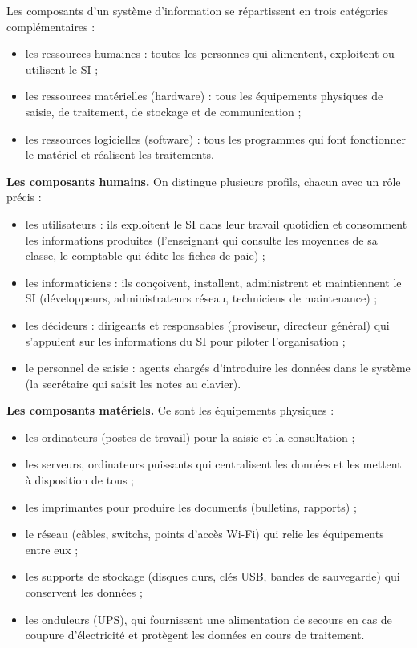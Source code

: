 \documentclass[11pt]{article}
\newcommand{\cle}[1]{{\popxbold\color{popdark}#1}}
\begin{document}
\begin{definition}
Les \cle{composants} d'un système d'information se répartissent en trois catégories complémentaires :
\begin{itemize}
\item les \cle{ressources humaines} : toutes les personnes qui alimentent, exploitent ou utilisent le SI ;
\item les \cle{ressources matérielles} (hardware) : tous les équipements physiques de saisie, de traitement, de stockage et de communication ;
\item les \cle{ressources logicielles} (software) : tous les programmes qui font fonctionner le matériel et réalisent les traitements.
\end{itemize}
\end{definition}

\textbf{Les composants humains.} On distingue plusieurs profils, chacun avec un rôle précis :
\begin{itemize}
\item les \cle{utilisateurs} : ils exploitent le SI dans leur travail quotidien et consomment les informations produites (l'enseignant qui consulte les moyennes de sa classe, le comptable qui édite les fiches de paie) ;
\item les \cle{informaticiens} : ils conçoivent, installent, administrent et maintiennent le SI (développeurs, administrateurs réseau, techniciens de maintenance) ;
\item les \cle{décideurs} : dirigeants et responsables (proviseur, directeur général) qui s'appuient sur les informations du SI pour piloter l'organisation ;
\item le \cle{personnel de saisie} : agents chargés d'introduire les données dans le système (la secrétaire qui saisit les notes au clavier).
\end{itemize}

\textbf{Les composants matériels.} Ce sont les équipements physiques :
\begin{itemize}
\item les \cle{ordinateurs} (postes de travail) pour la saisie et la consultation ;
\item les \cle{serveurs}, ordinateurs puissants qui centralisent les données et les mettent à disposition de tous ;
\item les \cle{imprimantes} pour produire les documents (bulletins, rapports) ;
\item le \cle{réseau} (câbles, switchs, points d'accès Wi-Fi) qui relie les équipements entre eux ;
\item les \cle{supports de stockage} (disques durs, clés USB, bandes de sauvegarde) qui conservent les données ;
\item les \cle{onduleurs} (UPS), qui fournissent une alimentation de secours en cas de coupure d'électricité et protègent les données en cours de traitement.
\end{itemize}
\end{document}
